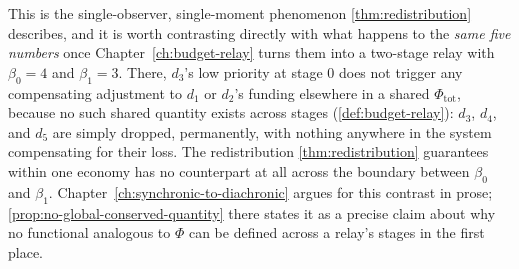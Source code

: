 This is the single-observer, single-moment phenomenon
\cref{thm:redistribution} describes, and it is worth contrasting directly
with what happens to the \emph{same five numbers} once
Chapter~\ref{ch:budget-relay} turns them into a two-stage relay with
$\beta_0 = 4$ and $\beta_1 = 3$. There, $d_3$'s low priority at stage $0$
does not trigger any compensating adjustment to $d_1$ or $d_2$'s funding
elsewhere in a shared $\Phi_{\mathrm{tot}}$, because no such shared
quantity exists across stages (\cref{def:budget-relay}): $d_3$, $d_4$, and
$d_5$ are simply dropped, permanently, with nothing anywhere in the
system compensating for their loss. The redistribution
\cref{thm:redistribution} guarantees within one economy has no
counterpart at all across the boundary between $\beta_0$ and $\beta_1$.
Chapter~\ref{ch:synchronic-to-diachronic} argues for this contrast in
prose; \cref{prop:no-global-conserved-quantity} there states it as a
precise claim about why no functional analogous to $\Phi$ can be defined
across a relay's stages in the first place.
